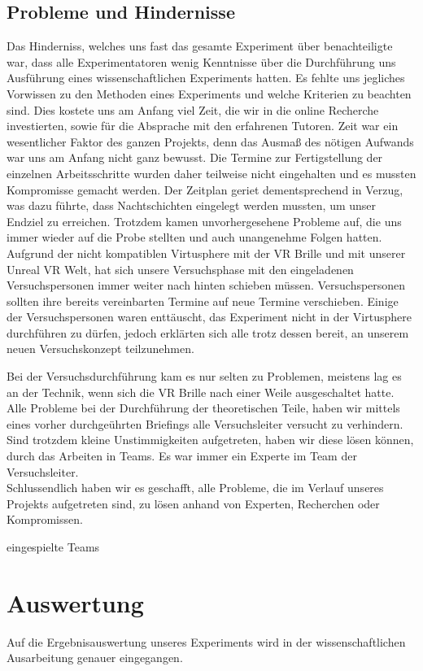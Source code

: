 \documentclass{Bericht}
\begin{document}
\subsection{Probleme und Hindernisse}
Das Hinderniss, welches uns fast das gesamte Experiment über benachteiligte war, dass alle Experimentatoren wenig Kenntnisse über die Durchführung uns Ausführung eines wissenschaftlichen Experiments hatten. Es fehlte uns jegliches Vorwissen zu den Methoden eines Experiments und welche Kriterien zu beachten sind. Dies kostete uns am Anfang viel Zeit, die wir in die online Recherche investierten, sowie für die Absprache mit den erfahrenen Tutoren. Zeit war ein wesentlicher Faktor des ganzen Projekts, denn das Ausmaß des nötigen Aufwands war uns am Anfang nicht ganz bewusst. Die Termine zur Fertigstellung der einzelnen Arbeitsschritte wurden daher teilweise nicht eingehalten und es mussten Kompromisse gemacht werden. Der Zeitplan geriet dementsprechend in Verzug, was dazu führte, dass Nachtschichten eingelegt werden mussten, um unser Endziel zu erreichen. Trotzdem kamen unvorhergesehene Probleme auf, die uns immer wieder auf die Probe stellten und auch unangenehme Folgen hatten. Aufgrund der nicht kompatiblen Virtusphere mit der VR Brille und mit unserer Unreal VR Welt, hat sich unsere Versuchsphase mit den eingeladenen Versuchspersonen immer weiter nach hinten schieben müssen. Versuchspersonen sollten ihre bereits vereinbarten Termine auf neue Termine verschieben. Einige der Versuchspersonen waren enttäuscht, das Experiment nicht in der Virtusphere durchführen zu dürfen, jedoch erklärten sich alle trotz dessen bereit, an unserem neuen Versuchskonzept teilzunehmen.

Bei der Versuchsdurchführung kam es nur selten zu Problemen, meistens lag es an der Technik, wenn sich die VR Brille nach einer Weile ausgeschaltet hatte. Alle Probleme bei der Durchführung der theoretischen Teile, haben wir mittels eines vorher durchgeührten Briefings alle Versuchsleiter versucht zu verhindern. Sind trotzdem kleine Unstimmigkeiten aufgetreten, haben wir diese lösen können, durch das Arbeiten in Teams. Es war immer ein Experte im Team der Versuchsleiter. \\
Schlussendlich haben wir es geschafft, alle Probleme, die im Verlauf unseres Projekts aufgetreten sind, zu lösen anhand von Experten, Recherchen oder Kompromissen.

eingespielte Teams

\newpage
\section{Auswertung} %
	Auf die Ergebnisauswertung unseres Experiments wird in der wissenschaftlichen Ausarbeitung genauer eingegangen.
\end{document}
